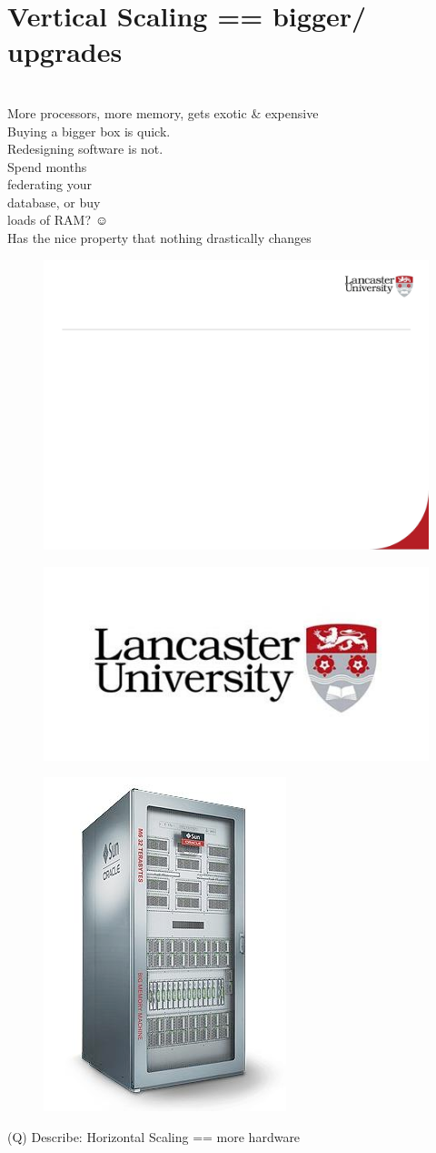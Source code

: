 \documentclass[12pt]{article}
\begin{document}
\section{Vertical Scaling == bigger/ upgrades}
\\
More processors, more memory, gets exotic \& expensive\\
Buying a bigger box is quick.\\
Redesigning software is not.\\
Spend months \\
federating your \\
database, or buy \\
loads of RAM? ☺\\
Has the nice property that nothing drastically changes\\
\begin{figure}[H]
\includegraphics[width=0.5\linewidth]{page72-image-1.png}
\end{figure}
\begin{figure}[H]
\includegraphics[width=0.5\linewidth]{page72-image-2.png}
\end{figure}
\begin{figure}[H]
\includegraphics[width=0.5\linewidth]{page72-image-3.png}
\end{figure}
\clearpage
(Q)
Describe: Horizontal Scaling == more hardware
\clearpage
\end{document}
